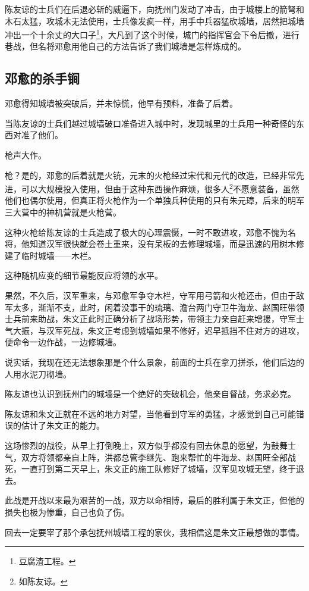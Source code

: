 \begin{multicols}{\theparacolNo}
		陈友谅的士兵们在后退必斩的威逼下，向抚州门发动了冲击，由于城楼上的箭弩和木石太猛，攻城木无法使用，士兵像发疯一样，用手中兵器猛砍城墙，居然把城墙冲出一个十余丈的大口子\footnote{豆腐渣工程。}，大凡到了这个时候，城门的指挥官会下令后撤，进行巷战，但名将邓愈用他自己的方法告诉了我们城墙是怎样炼成的。

		\subsection{邓愈的杀手锏}
		邓愈得知城墙被突破后，并未惊慌，他早有预料，准备了后着。

		当陈友谅的士兵们越过城墙破口准备进入城中时，发现城里的士兵用一种奇怪的东西对准了他们。

		枪声大作。

		枪？是的，邓愈的后着就是火铳，元末的火枪经过宋代和元代的改造，已经非常先进，可以大规模投入使用，但由于这种东西操作麻烦，很多人\footnote{如陈友谅。}不愿意装备，虽然他们也偶尔使用，但真正将火枪作为一个单独兵种使用的只有朱元璋，后来的明军三大营中的神机营就是火枪营。

		这种火枪给陈友谅的士兵造成了极大的心理震慑，一时不敢进攻，邓愈不愧为名将，他知道汉军很快就会卷土重来，没有呆板的去修理城墙，而是迅速的用树木修建了临时城墙——木栏。

		这种随机应变的细节最能反应将领的水平。

		果然，不久后，汉军重来，与邓愈军争夺木栏，守军用弓箭和火枪还击，但由于敌军太多，渐渐不支，此时，闲着没事干的琉璃、澹台两门守卫牛海龙、赵国旺带领士兵前来助战，朱文正此时正确分析了战场形势，带领主力亲自赶来增援，守军士气大振，与汉军死战，朱文正考虑到城墙如果不修好，迟早抵挡不住对方的进攻，便命令一边作战，一边修城墙。

		说实话，我现在还无法想象那是个什么景象，前面的士兵在拿刀拼杀，他们后边的人用水泥刀砌墙。

		陈友谅也认识到抚州门的城墙是一个绝好的突破机会，他亲自督战，务求必克。

		陈友谅和朱文正就在不远的地方对望，当他看到守军的勇猛，才感觉到自己可能错误的估计了朱文正的能力。

		这场惨烈的战役，从早上打倒晚上，双方似乎都没有回去休息的愿望，为鼓舞士气，双方将领都亲自上阵，洪都总管李继先、跑来帮忙的牛海龙、赵国旺全部战死，一直打到第二天早上，朱文正的施工队修好了城墙，汉军见攻城无望，终于退去。

		此战是开战以来最为艰苦的一战，双方以命相博，最后的胜利属于朱文正，但他的损失也极为惨重，自己也负了伤。

		回去一定要宰了那个承包抚州城墙工程的家伙，我相信这是朱文正最想做的事情。


\end{multicols}
